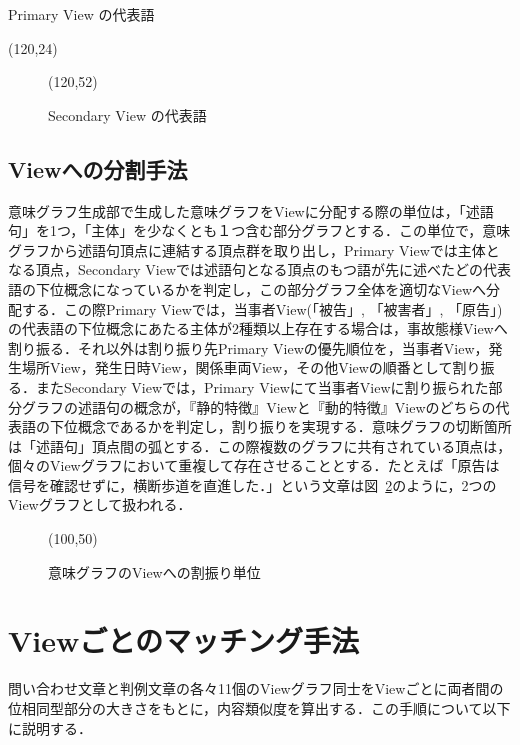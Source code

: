 \begin{table}
\begin{center}
 \leavevmode
 \caption{Primary View の代表語}
 \atari(120,24)
 \label{fig:primaryview}
\end{center}
\end{table}

\begin{figure}
\begin{center}
 \leavevmode
 \atari(120,52)
 \caption{Secondary View の代表語}
 \label{fig:secondaryview}
\end{center}
\end{figure}

\subsection{Viewへの分割手法}
意味グラフ生成部で生成した意味グラフをViewに分配する際の単位は，「述語句」を1つ，「主体」を少なくとも１つ含む部分グラフとする．この単位で，意味グラフから述語句頂点に連結する頂点群を取り出し，Primary Viewでは主体となる頂点，Secondary Viewでは述語句となる頂点のもつ語が先に述べたどの代表語の下位概念になっているかを判定し，この部分グラフ全体を適切なViewへ分配する．この際Primary Viewでは，当事者View(「被告」, 「被害者」, 「原告」)の代表語の下位概念にあたる主体が2種類以上存在する場合は，事故態様Viewへ割り振る．それ以外は割り振り先Primary Viewの優先順位を，当事者View，発生場所View，発生日時View，関係車両View，その他Viewの順番として割り振る．またSecondary Viewでは，Primary Viewにて当事者Viewに割り振られた部分グラフの述語句の概念が，『静的特徴』Viewと『動的特徴』Viewのどちらの代表語の下位概念であるかを判定し，割り振りを実現する．意味グラフの切断箇所は「述語句」頂点間の弧とする．この際複数のグラフに共有されている頂点は，個々のViewグラフにおいて重複して存在させることとする．たとえば「原告は信号を確認せずに，横断歩道を直進した．」という文章は図~\ref{fig:graphrule}のように，2つのViewグラフとして扱われる．

\begin{figure}
\begin{center}
 \atari(100,50)
 \caption{意味グラフのViewへの割振り単位}
 \label{fig:graphrule}
\end{center}
\end{figure}

\section{Viewごとのマッチング手法}
問い合わせ文章と判例文章の各々11個のViewグラフ同士をViewごとに両者間の位相同型部分の大きさをもとに，内容類似度を算出する．この手順について以下に説明する．

